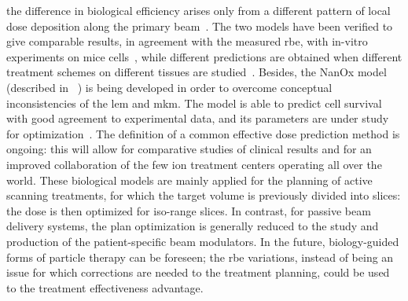 the difference in biological efficiency arises only from a different pattern of local dose deposition along the primary beam~\parencite{Kramer2000, Jakel2001a}.
The two models have been verified to give comparable results, in agreement with the measured \gls{rbe}, with in-vitro experiments on mice cells~\parencite{Uzawa2009}, while different predictions are obtained when different treatment schemes on different tissues are studied~\parencite{Fossati2012, Steinstrater2012}. Besides, the NanOx model (described in ~\cite{Cunha2017}) is being developed in order to overcome conceptual inconsistencies of the \gls{lem} and \gls{mkm}. The model is able to predict cell survival with good agreement to experimental data, and its parameters are under study for optimization~\parencite{Monini2018}. The definition of a common effective dose prediction method is ongoing: this will allow for comparative studies of clinical results and for an improved collaboration of the few ion treatment centers operating all over the world.
These biological models are mainly applied for the planning of active scanning treatments, for which the target volume is previously divided into slices: the dose is then optimized for iso-range slices. In contrast, for passive beam delivery systems, the plan optimization is generally reduced to the study and production of the patient-specific beam modulators. 
In the future, biology-guided forms of particle therapy can be foreseen; the \gls{rbe} variations, instead of being an issue for which corrections are needed to the treatment planning, could be used to the treatment effectiveness advantage.  
